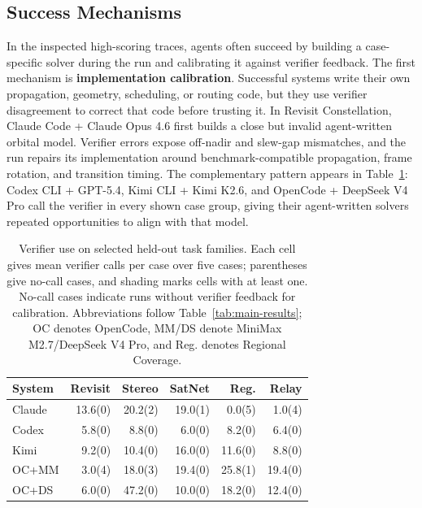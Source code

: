 \documentclass[11pt]{article}
\begin{document}
\subsection{Success Mechanisms}
\label{sec:what-succeeds}

In the inspected high-scoring traces, agents often succeed by building a case-specific solver during the run and calibrating it against verifier feedback. The first mechanism is \textbf{implementation calibration}. Successful systems write their own propagation, geometry, scheduling, or routing code, but they use verifier disagreement to correct that code before trusting it. In Revisit Constellation, Claude Code + Claude Opus 4.6 first builds a close but invalid agent-written orbital model. Verifier errors expose off-nadir and slew-gap mismatches, and the run repairs its implementation around benchmark-compatible propagation, frame rotation, and transition timing. The complementary pattern appears in Table~\ref{tab:verifier-calls}: Codex CLI + GPT-5.4, Kimi CLI + Kimi K2.6, and OpenCode + DeepSeek V4 Pro call the verifier in every shown case group, giving their agent-written solvers repeated opportunities to align with that model.

\begin{table}[t]
\centering
\footnotesize
\setlength{\tabcolsep}{3.2pt}
\begin{tabular}{lrrrrr}
\hline
System & Revisit & Stereo & SatNet & Reg. & Relay \\
\hline
Claude & 13.6(0) & \cellcolor{zerocallcell}20.2(2) & \cellcolor{zerocallcell}19.0(1) & \cellcolor{zerocallcell}0.0(5) & \cellcolor{zerocallcell}1.0(4) \\
Codex & 5.8(0) & 8.8(0) & 6.0(0) & 8.2(0) & 6.4(0) \\
Kimi & 9.2(0) & 10.4(0) & 16.0(0) & 11.6(0) & 8.8(0) \\
OC+MM & \cellcolor{zerocallcell}3.0(4) & \cellcolor{zerocallcell}18.0(3) & 19.4(0) & \cellcolor{zerocallcell}25.8(1) & 19.4(0) \\
OC+DS & 6.0(0) & 47.2(0) & 10.0(0) & 18.2(0) & 12.4(0) \\
\hline
\end{tabular}
\caption{Verifier use on selected held-out task families. Each cell gives mean verifier calls per case over five cases; parentheses give no-call cases, and shading marks cells with at least one. No-call cases indicate runs without verifier feedback for calibration. Abbreviations follow Table~\ref{tab:main-results}; OC denotes OpenCode, MM/DS denote MiniMax M2.7/DeepSeek V4 Pro, and Reg. denotes Regional Coverage.}
\label{tab:verifier-calls}
\end{table}
\end{document}
